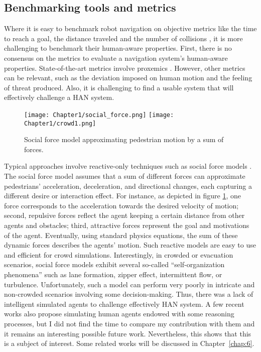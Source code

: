 \subsection{Benchmarking tools and metrics}

Where it is easy to benchmark robot navigation on objective metrics like the time to reach a goal, the distance traveled and the number of collisions \cite{perille2020benchmarking}, it is more challenging to benchmark their human-aware properties.
First, there is no consensus on the metrics to evaluate a navigation system's human-aware properties. State-of-the-art metrics involve proxemics \cite{samarakoon2022review}. However, other metrics can be relevant, such as the deviation imposed on human motion and the feeling of threat produced.
Also, it is challenging to find a usable system that will effectively challenge a HAN system. 

\begin{figure}
    \center
    \texttt{[image: Chapter1/social\_force.png]}
    \texttt{[image: Chapter1/crowd1.png]}
    \caption{Social force model approximating pedestrian motion by a sum of forces.}
    \label{fig:social_force_model}
\end{figure}

Typical approaches involve reactive-only techniques such as social force models \cite{helbing1995social,chen_social_2018}. 
The social force model assumes that a sum of different forces can approximate pedestrians' acceleration, deceleration, and directional changes, each capturing a different desire or interaction effect. For instance, as depicted in figure \ref{fig:social_force_model}, one force corresponds to the acceleration towards the desired velocity of motion; second, repulsive forces reflect the agent keeping a certain distance from other agents and obstacles; third, attractive forces represent the goal and motivations of the agent. Eventually, using standard physics equations, the sum of these dynamic forces describes the agents' motion.
Such reactive models are easy to use and efficient for crowd simulations. Interestingly, in crowded or evacuation scenarios, social force models exhibit several so-called ``self-organization phenomena'' such as lane formation, zipper effect, intermittent flow, or turbulence.
Unfortunately, such a model can perform very poorly in intricate and non-crowded scenarios involving some decision-making. Thus, there was a lack of intelligent simulated agents to challenge effectively HAN system.
A few recent works also propose simulating human agents endowed with some reasoning processes, but I did not find the time to compare my contribution with them and it remains an interesting possible future work. Nevertheless, this shows that this is a subject of interest. Some related works will be discussed in Chapter~\ref{chap:6}.
